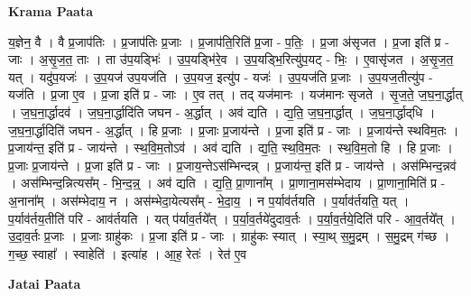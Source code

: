 \documentclass[17pt]{extarticle}
\begin{document}
\textbf{Krama Paata} \newline

य॒ज्ञेन॒ वै । वै प्र॒जाप॑तिः । प्र॒जाप॑तिः प्र॒जाः । प्र॒जाप॑ति॒रिति॑ प्र॒जा - प॒तिः॒ । प्र॒जा अ॑सृजत । प्र॒जा इति॑ प्र - जाः । अ॒सृ॒ज॒त॒ ताः । ता उ॑प॒यड्भिः॑ । उ॒प॒यड्भि॑रे॒व । उ॒प॒यड्भि॒रित्यु॑प॒यट् - भिः॒ । ए॒वासृ॑जत । अ॒सृ॒ज॒त॒ यत् । यदु॑प॒यजः॑ । उ॒प॒यज॑ उप॒यज॑ति । उ॒प॒यज॒ इत्यु॑प - यजः॑ । उ॒प॒यज॑ति प्र॒जाः । उ॒प॒यज॒तीत्यु॑प - यज॑ति । प्र॒जा ए॒व । प्र॒जा इति॑ प्र - जाः । ए॒व तत् । तद् यज॑मानः । यज॑मानः सृजते । सृ॒ज॒ते॒ ज॒घ॒ना॒र्द्धात् । ज॒घ॒ना॒र्द्धादव॑ । ज॒घ॒ना॒र्द्धादि॑ति जघन - अ॒र्द्धात् । अव॑ द्यति । द्य॒ति॒ ज॒घ॒ना॒र्द्धात् । ज॒घ॒ना॒र्द्धाद्‌धि । ज॒घ॒ना॒र्द्धादिति॑ जघन - अ॒र्द्धात् । हि प्र॒जाः । प्र॒जाः प्र॒जाय॑न्ते । प्र॒जा इति॑ प्र - जाः । प्र॒जाय॑न्ते स्थविम॒तः । प्र॒जाय॑न्त॒ इति॑ प्र - जाय॑न्ते । स्थ॒वि॒म॒तोऽव॑ । अव॑ द्यति । द्य॒ति॒ स्थ॒वि॒म॒तः । स्थ॒वि॒म॒तो हि । हि प्र॒जाः । प्र॒जाः प्र॒जाय॑न्ते । प्र॒जा इति॑ प्र - जाः । प्र॒जाय॒न्तेऽस॑म्भिन्दन्न् । प्र॒जाय॑न्त॒ इति॑ प्र - जाय॑न्ते । अस॑म्भिन्द॒न्नव॑ । अस॑म्भिन्द॒न्नित्यस᳚म् - भि॒न्द॒न्न्॒ । अव॑ द्यति । द्य॒ति॒ प्रा॒णाना᳚म् । प्रा॒णाना॒मस॑म्भेदाय । प्रा॒णाना॒मिति॑ प्र - अ॒नाना᳚म् । अस॑म्भेदाय॒ न । अस॑म्भेदा॒येत्यस᳚म् - भे॒दा॒य॒ । न प॒र्याव॑र्तयति । प॒र्याव॑र्तयति॒ यत् । प॒र्याव॑र्तय॒तीति॑ परि - आव॑र्तयति । यत् प॑र्याव॒र्तये᳚त् । प॒र्या॒व॒र्तये॑दुदाव॒र्तः । प॒र्या॒व॒र्तये॒दिति॑ परि - आ॒व॒र्तये᳚त् । उ॒दा॒व॒र्तः प्र॒जाः । प्र॒जाः ग्राहु॑कः । प्र॒जा इति॑ प्र - जाः । ग्राहु॑कः स्यात् । स्या॒थ् स॒मु॒द्रम् । स॒मु॒द्रम् ग॑च्छ । ग॒च्छ॒ स्वाहा᳚ । स्वाहेति॑ । इत्या॑ह । आ॒ह॒ रेतः॑ । रेत॑ ए॒व \newline

\textbf{Jatai Paata} \newline
\end{document}
